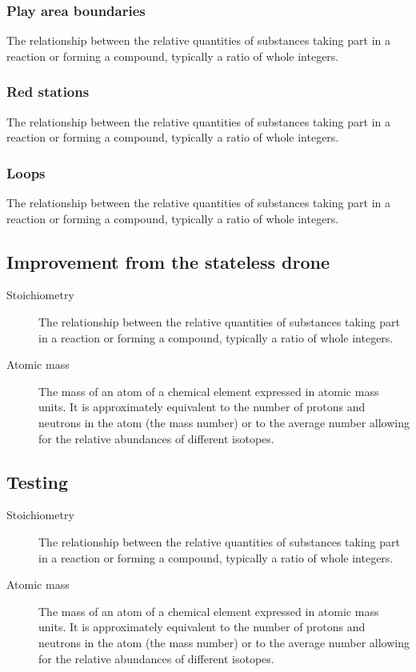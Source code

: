 \documentclass{article}
\begin{document}
\subsubsection{Play area boundaries}
\begin{description}
The relationship between the relative quantities of substances taking part in a reaction or forming a compound, typically a ratio of whole integers.
\end{description} 

\subsubsection{Red stations}
\begin{description}
The relationship between the relative quantities of substances taking part in a reaction or forming a compound, typically a ratio of whole integers.
\end{description} 

\subsubsection{Loops}
\begin{description}
The relationship between the relative quantities of substances taking part in a reaction or forming a compound, typically a ratio of whole integers.
\end{description} 


\subsection{Improvement from the stateless drone}
\label{Class Relationships}
\begin{description}
\item[Stoichiometry]
The relationship between the relative quantities of substances taking part in a reaction or forming a compound, typically a ratio of whole integers.
\item[Atomic mass]
The mass of an atom of a chemical element expressed in atomic mass units. It is approximately equivalent to the number of protons and neutrons in the atom (the mass number) or to the average number allowing for the relative abundances of different isotopes. 
\end{description} 


\subsection{Testing}
\label{Class Relationships}
\begin{description}
\item[Stoichiometry]
The relationship between the relative quantities of substances taking part in a reaction or forming a compound, typically a ratio of whole integers.
\item[Atomic mass]
The mass of an atom of a chemical element expressed in atomic mass units. It is approximately equivalent to the number of protons and neutrons in the atom (the mass number) or to the average number allowing for the relative abundances of different isotopes. 
\end{description} 
\end{document}
